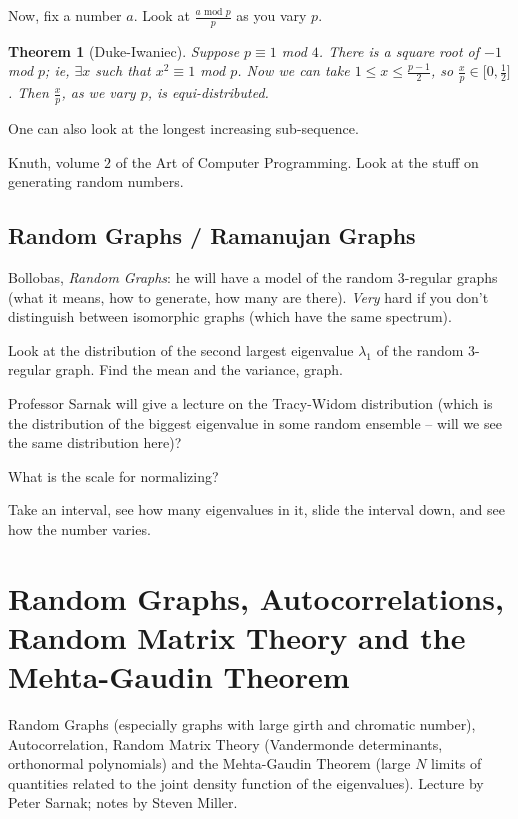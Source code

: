 \documentclass[12pt,letterpaper]{report}
\newcommand{\foh}{\frac{1}{2}}  %
\newtheorem{thm}{Theorem}[section]
\begin{document}
Now, fix a number $a$. Look at $\frac{ \text{$a$ mod $p$}}{p}$ as
you vary $p$.

\begin{thm}[Duke-Iwaniec] Suppose $p \equiv 1$ mod $4$. There is a square root
of $-1$ mod $p$; ie, $\exists x$ such that $x^2 \equiv 1$ mod $p$.
Now we can take $1 \le x \le \frac{p-1}{2}$, so $\frac{x}{p} \in
\Big[0, \foh \Big]$. Then $\frac{x}{p}$, as we vary $p$, is
equi-distributed.
\end{thm}

One can also look at the longest increasing sub-sequence.

Knuth, volume $2$ of the Art of Computer Programming. Look at the
stuff on generating random numbers.




\section{Random Graphs / Ramanujan Graphs}


Bollobas, \emph{Random Graphs}: he will have a model of the random
$3$-regular graphs (what it means, how to generate, how many are
there). \emph{Very} hard if you don't distinguish between
isomorphic graphs (which have the same spectrum).

Look at the distribution of the second largest eigenvalue
$\lambda_1$ of the random $3$-regular graph. Find the mean and the
variance, graph.

Professor Sarnak will give a lecture on the Tracy-Widom
distribution (which is the distribution of the biggest eigenvalue
in some random ensemble -- will we see the same distribution
here)?

What is the scale for normalizing?

Take an interval, see how many eigenvalues in it, slide the
interval down, and see how the number varies.




\chapter{Random Graphs, Autocorrelations, Random Matrix Theory
and the Mehta-Gaudin Theorem}

Random Graphs (especially graphs with large girth and chromatic
number), Autocorrelation, Random Matrix Theory (Vandermonde
determinants, orthonormal polynomials) and the Mehta-Gaudin
Theorem (large $N$ limits of quantities related to the joint
density function of the eigenvalues). Lecture by Peter Sarnak;
notes by Steven Miller.
\end{document}
